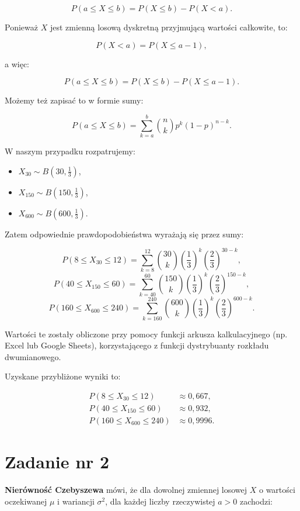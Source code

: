 \documentclass{article}
\begin{document}
\[
P(a \leq X \leq b) = P(X \leq b) - P(X < a).
\]

Ponieważ \( X \) jest zmienną losową dyskretną przyjmującą wartości całkowite, to:

\[
P(X < a) = P(X \leq a - 1),
\]

a więc:

\[
P(a \leq X \leq b) = P(X \leq b) - P(X \leq a - 1).
\]

Możemy też zapisać to w formie sumy:

\[
P(a \leq X \leq b) = \sum_{k = a}^{b} \binom{n}{k} p^k (1 - p)^{n - k}.
\]

W naszym przypadku rozpatrujemy:

\begin{itemize}
    \item \( X_{30} \sim B(30, \frac{1}{3}) \),
    \item \( X_{150} \sim B(150, \frac{1}{3}) \),
    \item \( X_{600} \sim B(600, \frac{1}{3}) \).
\end{itemize}

Zatem odpowiednie prawdopodobieństwa wyrażają się przez sumy:

\[
P(8 \leq X_{30} \leq 12) = \sum_{k=8}^{12} \binom{30}{k} \left( \frac{1}{3} \right)^k \left( \frac{2}{3} \right)^{30 - k},
\]
\[
P(40 \leq X_{150} \leq 60) = \sum_{k=40}^{60} \binom{150}{k} \left( \frac{1}{3} \right)^k \left( \frac{2}{3} \right)^{150 - k},
\]
\[
P(160 \leq X_{600} \leq 240) = \sum_{k=160}^{240} \binom{600}{k} \left( \frac{1}{3} \right)^k \left( \frac{2}{3} \right)^{600 - k}.
\]

Wartości te zostały obliczone przy pomocy funkcji arkusza kalkulacyjnego (np. Excel lub Google Sheets), korzystającego z funkcji dystrybuanty rozkładu dwumianowego.

Uzyskane przybliżone wyniki to:

\begin{align*}
P(8 \leq X_{30} \leq 12) &\approx 0{,}667, \\
P(40 \leq X_{150} \leq 60) &\approx 0{,}932, \\
P(160 \leq X_{600} \leq 240) &\approx 0{,}9996.
\end{align*}


\section{Zadanie nr 2}

\textbf{Nierówność Czebyszewa} mówi, że dla dowolnej zmiennej losowej \( X \) o wartości oczekiwanej \( \mu \) i wariancji \( \sigma^2 \), dla każdej liczby rzeczywistej \( a > 0 \) zachodzi:
\end{document}

